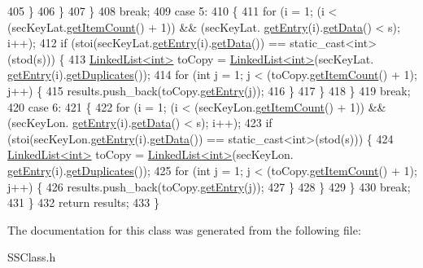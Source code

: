 \begin{DoxyCode}
405             \}
406         \}
407     \}
408     \textcolor{keywordflow}{break};
409     \textcolor{keywordflow}{case} 5:
410     \{
411         \textcolor{keywordflow}{for} (i = 1; (i < (secKeyLat.\hyperlink{classLinkedList_afc6635f854f48f2f126cf3b60d845220}{getItemCount}() + 1)) && (secKeyLat.
      \hyperlink{classLinkedList_a341bfd7772c9d24d29eb7a7f3936915b}{getEntry}(i).\hyperlink{classSecKeySS_add52510d280d0ca89b653386500f08f5}{getData}() < s); i++);
412         \textcolor{keywordflow}{if} (stoi(secKeyLat.\hyperlink{classLinkedList_a341bfd7772c9d24d29eb7a7f3936915b}{getEntry}(i).\hyperlink{classSecKeySS_add52510d280d0ca89b653386500f08f5}{getData}()) == static\_cast<int>(stod(s))) \{
413             \hyperlink{classLinkedList}{LinkedList<int>} toCopy = \hyperlink{classLinkedList}{LinkedList<int>}(secKeyLat.
      \hyperlink{classLinkedList_a341bfd7772c9d24d29eb7a7f3936915b}{getEntry}(i).\hyperlink{classSecKeySS_aaae9db891cfcdc3f78d8a44145f4f08c}{getDuplicates}());
414             \textcolor{keywordflow}{for} (\textcolor{keywordtype}{int} j = 1; j < (toCopy.\hyperlink{classLinkedList_afc6635f854f48f2f126cf3b60d845220}{getItemCount}() + 1); j++) \{
415                 results.push\_back(toCopy.\hyperlink{classLinkedList_a341bfd7772c9d24d29eb7a7f3936915b}{getEntry}(j));
416             \}
417         \}
418     \}
419     \textcolor{keywordflow}{break};
420     \textcolor{keywordflow}{case} 6:
421     \{
422         \textcolor{keywordflow}{for} (i = 1; (i < (secKeyLon.\hyperlink{classLinkedList_afc6635f854f48f2f126cf3b60d845220}{getItemCount}() + 1)) && (secKeyLon.
      \hyperlink{classLinkedList_a341bfd7772c9d24d29eb7a7f3936915b}{getEntry}(i).\hyperlink{classSecKeySS_add52510d280d0ca89b653386500f08f5}{getData}() < s); i++);
423         \textcolor{keywordflow}{if} (stoi(secKeyLon.\hyperlink{classLinkedList_a341bfd7772c9d24d29eb7a7f3936915b}{getEntry}(i).\hyperlink{classSecKeySS_add52510d280d0ca89b653386500f08f5}{getData}()) == static\_cast<int>(stod(s))) \{
424             \hyperlink{classLinkedList}{LinkedList<int>} toCopy = \hyperlink{classLinkedList}{LinkedList<int>}(secKeyLon.
      \hyperlink{classLinkedList_a341bfd7772c9d24d29eb7a7f3936915b}{getEntry}(i).\hyperlink{classSecKeySS_aaae9db891cfcdc3f78d8a44145f4f08c}{getDuplicates}());
425             \textcolor{keywordflow}{for} (\textcolor{keywordtype}{int} j = 1; j < (toCopy.\hyperlink{classLinkedList_afc6635f854f48f2f126cf3b60d845220}{getItemCount}() + 1); j++) \{
426                 results.push\_back(toCopy.\hyperlink{classLinkedList_a341bfd7772c9d24d29eb7a7f3936915b}{getEntry}(j));
427             \}
428         \}
429     \}
430     \textcolor{keywordflow}{break};
431     \}
432     \textcolor{keywordflow}{return} results;
433 \}
\end{DoxyCode}


The documentation for this class was generated from the following file\+:\begin{DoxyCompactItemize}
\item 
S\+S\+Class.\+h\end{DoxyCompactItemize}
